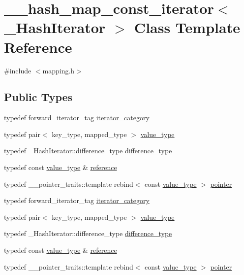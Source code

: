 \hypertarget{class____hash__map__const__iterator}{}\section{\+\_\+\+\_\+hash\+\_\+map\+\_\+const\+\_\+iterator$<$ \+\_\+\+Hash\+Iterator $>$ Class Template Reference}
\label{class____hash__map__const__iterator}


{\ttfamily \#include $<$mapping.\+h$>$}

\subsection*{Public Types}
\begin{DoxyCompactItemize}
\item 
typedef forward\+\_\+iterator\+\_\+tag \hyperlink{class____hash__map__const__iterator_a0135bf4f02eedc8d20290718247ae331}{iterator\+\_\+category}
\item 
typedef pair$<$ key\+\_\+type, mapped\+\_\+type $>$ \hyperlink{class____hash__map__const__iterator_aa5fda7b5c351e3103cfa5bf694b500b4}{value\+\_\+type}
\item 
typedef \+\_\+\+Hash\+Iterator\+::difference\+\_\+type \hyperlink{class____hash__map__const__iterator_abb62a6764e9e5be48b0704166bbb7aa0}{difference\+\_\+type}
\item 
typedef const \hyperlink{class____hash__map__const__iterator_aa5fda7b5c351e3103cfa5bf694b500b4}{value\+\_\+type} \& \hyperlink{class____hash__map__const__iterator_a94a3447535fb67a3c48b0acded52fd84}{reference}
\item 
typedef \+\_\+\+\_\+pointer\+\_\+traits\+::template rebind$<$ const \hyperlink{class____hash__map__const__iterator_aa5fda7b5c351e3103cfa5bf694b500b4}{value\+\_\+type} $>$ \hyperlink{class____hash__map__const__iterator_a4bb73ff2685ed4941c03a85bf4248e90}{pointer}
\item 
typedef forward\+\_\+iterator\+\_\+tag \hyperlink{class____hash__map__const__iterator_a0135bf4f02eedc8d20290718247ae331}{iterator\+\_\+category}
\item 
typedef pair$<$ key\+\_\+type, mapped\+\_\+type $>$ \hyperlink{class____hash__map__const__iterator_aa5fda7b5c351e3103cfa5bf694b500b4}{value\+\_\+type}
\item 
typedef \+\_\+\+Hash\+Iterator\+::difference\+\_\+type \hyperlink{class____hash__map__const__iterator_abb62a6764e9e5be48b0704166bbb7aa0}{difference\+\_\+type}
\item 
typedef const \hyperlink{class____hash__map__const__iterator_aa5fda7b5c351e3103cfa5bf694b500b4}{value\+\_\+type} \& \hyperlink{class____hash__map__const__iterator_a94a3447535fb67a3c48b0acded52fd84}{reference}
\item 
typedef \+\_\+\+\_\+pointer\+\_\+traits\+::template rebind$<$ const \hyperlink{class____hash__map__const__iterator_aa5fda7b5c351e3103cfa5bf694b500b4}{value\+\_\+type} $>$ \hyperlink{class____hash__map__const__iterator_a4bb73ff2685ed4941c03a85bf4248e90}{pointer}
\end{DoxyCompactItemize}
